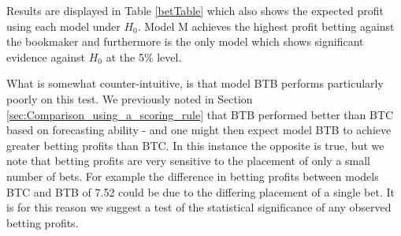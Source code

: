 Results are displayed in Table \ref{betTable} which also shows the expected profit using each model under \(H_0\). Model
M achieves the highest profit betting against the bookmaker and furthermore is the only model which shows significant
evidence against \(H_0\) at the 5\% level.
\begin{table}
\centering
{}
\caption{\label{betTable} The results of the hypothesis test \(H_0\): the bookmaker's estimated probabilities are
correct, against \(H_1\): the use of model probabilities gives the bettor an advantage over the bookmaker}
\end{table}
What is somewhat counter-intuitive, is that model BTB performs particularly poorly on this test. We previously noted in
Section \ref{sec:Comparison_using_a_scoring_rule} that BTB performed better than BTC based on forecasting ability - and
one might then expect model BTB to achieve greater betting profits than BTC. In this instance the opposite is true, but
we note that betting profits are very sensitive to the placement of only a small number of bets. For example the
difference in betting profits between models BTC and BTB of 7.52 could be due to the differing placement of a single
bet. It is for this reason we suggest a test of the statistical significance of any observed betting profits.
 
